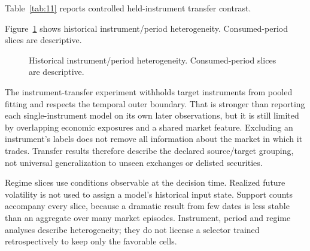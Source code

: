 \noindent Table~\ref{tab:11} reports controlled held-instrument transfer contrast.



\noindent Figure~\ref{fig:9} shows historical instrument/period heterogeneity. Consumed-period slices are descriptive.

\begin{figure}[htbp]\centering

\caption{Historical instrument/period heterogeneity. Consumed-period slices are descriptive.}\label{fig:9}
\end{figure}

The instrument-transfer experiment withholds target instruments from pooled fitting and respects the temporal outer boundary. That is stronger than reporting each single-instrument model on its own later observations, but it is still limited by overlapping economic exposures and a shared market feature. Excluding an instrument's labels does not remove all information about the market in which it trades. Transfer results therefore describe the declared source/target grouping, not universal generalization to unseen exchanges or delisted securities.

Regime slices use conditions observable at the decision time. Realized future volatility is not used to assign a model's historical input state. Support counts accompany every slice, because a dramatic result from few dates is less stable than an aggregate over many market episodes. Instrument, period and regime analyses describe heterogeneity; they do not license a selector trained retrospectively to keep only the favorable cells.
